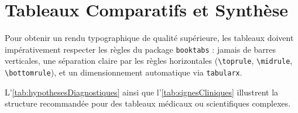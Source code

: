 \section{Tableaux Comparatifs et Synthèse}
\label{sec:tableaux}

Pour obtenir un rendu typographique de qualité supérieure, les tableaux doivent impérativement respecter les règles du package \texttt{booktabs} :
jamais de barres verticales, une séparation claire par les règles horizontales (\texttt{\textbackslash toprule}, \texttt{\textbackslash midrule}, \texttt{\textbackslash bottomrule}), et un dimensionnement automatique via \texttt{tabularx}.

L'\cref{tab:hypothesesDiagnostiques} ainsi que l'\cref{tab:signesCliniques} illustrent la structure recommandée pour des tableaux médicaux ou scientifiques complexes.



